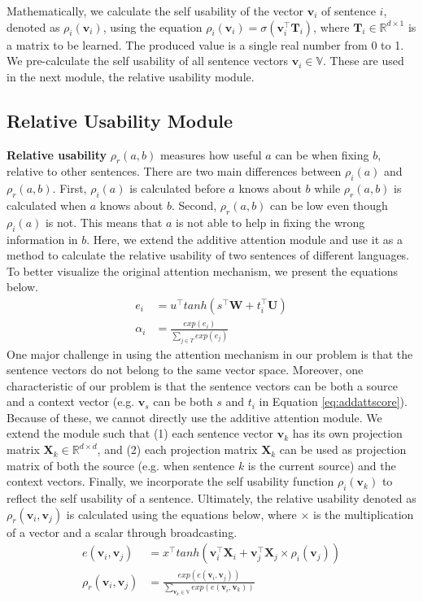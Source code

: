 \documentclass{article}
\begin{document}
Mathematically, we calculate the self usability of the vector $\mathbf{v}_i$ of sentence $i$, denoted as $\rho_{i}(\mathbf{v}_i)$, using the equation $\rho_i(\mathbf{v}_i) = \sigma(\mathbf{v}_i^\top \mathbf{T}_i)$, where $\mathbf{T}_i \in \mathbb{R}^{d \times 1}$ is a matrix to be learned. The produced value is a single real number from 0 to 1.
We pre-calculate the self usability of all sentence vectors $\mathbf{v}_i \in \mathbb{V}$. These are used in the next module, the relative usability module.

\subsection{Relative Usability Module}

\textbf{Relative usability} $\rho_r(a, b)$ measures how useful $a$ can be when fixing $b$, relative to other sentences. There are two main differences between $\rho_i(a)$ and $\rho_r(a, b)$. First, $\rho_i(a)$ is calculated before $a$ knows about $b$ while $\rho_r(a, b)$ is calculated when $a$ knows about $b$. Second, $\rho_r(a, b)$ can be low even though $\rho_i(a)$ is not. This means that $a$ is not able to help in fixing the wrong information in $b$.
Here, we extend the additive attention module \cite{bahdanau2014neural} and use it as a method to calculate the relative usability of two sentences of different languages. To better visualize the original attention mechanism, we present the equations below.
\begin{align}
    \label{eq:addattscore}
    e_i &= u^\top tanh( s^\top \mathbf{W}+t_i^\top \mathbf{U} ) \\
    \alpha_i &= \frac{exp(e_i)}{\sum_{j \in T} exp(e_j)}
\end{align}
One major challenge in using the attention mechanism in our problem is that the sentence vectors do not belong to the same vector space. Moreover, one characteristic of our problem is that the sentence vectors can be both a source and a context vector (e.g. $\mathbf{v}_s$ can be both $s$ and $t_i$ in Equation \ref{eq:addattscore}). Because of these, we cannot directly use the additive attention module. We extend the module such that (1) each sentence vector $\mathbf{v}_k$ has its own projection matrix $\mathbf{X}_k \in \mathbb{R}^{d \times d}$, and (2) each projection matrix $\mathbf{X}_k$ can be used as projection matrix of both the source (e.g. when sentence $k$ is the current source) and the context vectors. Finally, we incorporate the self usability function $\rho_i(\mathbf{v}_k)$ to reflect the self usability of a sentence. Ultimately, the relative usability denoted as $\rho_r(\mathbf{v}_i, \mathbf{v}_j)$ is calculated using the equations below, where $\times$ is the multiplication of a vector and a scalar through broadcasting.
\begin{align}
    e(\mathbf{v}_i, \mathbf{v}_j) &= x^\top tanh( \mathbf{v}_i^\top \mathbf{X}_i+\mathbf{v}_j^\top \mathbf{X}_j \times \rho_i(\mathbf{v}_j) ) \\
    \rho_r(\mathbf{v}_i, \mathbf{v}_j) &= \frac{exp(e(\mathbf{v}_i, \mathbf{v}_j))}{\sum_{\mathbf{v}_k \in \mathbb{V}} exp(e(\mathbf{v}_i, \mathbf{v}_k))}
\end{align}
\end{document}
